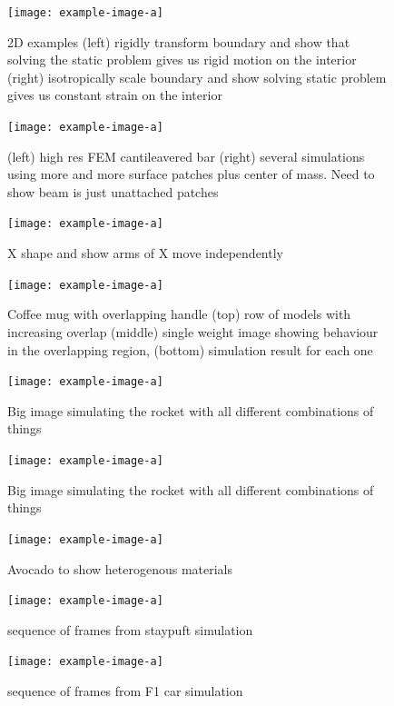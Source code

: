 \begin{figure}
  \texttt{[image: example-image-a]}
  \caption{2D examples (left) rigidly transform boundary and show that solving the static problem gives us rigid motion on the interior (right) isotropically scale boundary and show solving static problem gives us constant strain on the interior}
  \label{fig:patchtest}
\end{figure}

\begin{figure}
  \texttt{[image: example-image-a]}
  \caption{(left) high res FEM cantileavered bar (right) several simulations using more and more surface patches plus center of mass. Need to show beam is just  unattached patches}
  \label{fig:convergence}
\end{figure}

\begin{figure}
  \texttt{[image: example-image-a]}
  \caption{X shape and show arms of X move independently}
  \label{fig:independence}
\end{figure}

\begin{figure}
  \texttt{[image: example-image-a]}
  \caption{Coffee mug with overlapping handle (top) row of models with increasing overlap (middle) single weight image showing behaviour in the overlapping region, (bottom) simulation result for each one}
  \label{fig:badmodels}
\end{figure}

\begin{figure}
  \texttt{[image: example-image-a]}
  \caption{Big image simulating the rocket with all different combinations of things}
  \label{fig:materials}
\end{figure}

\begin{figure}
  \texttt{[image: example-image-a]}
  \caption{Big image simulating the rocket with all different combinations of things}
  \label{fig:materials}
\end{figure}

\begin{figure}
  \texttt{[image: example-image-a]}
  \caption{Avocado to show heterogenous materials}
  \label{fig:avocado}
\end{figure}

\begin{figure}[htp]
  \texttt{[image: example-image-a]}
  \caption{sequence of frames from staypuft simulation}
  \label{fig:staypuft}
\end{figure}

\begin{figure}[htp]
  \texttt{[image: example-image-a]}
  \caption{sequence of frames from F1 car simulation}
  \label{fig:f1}
\end{figure}
